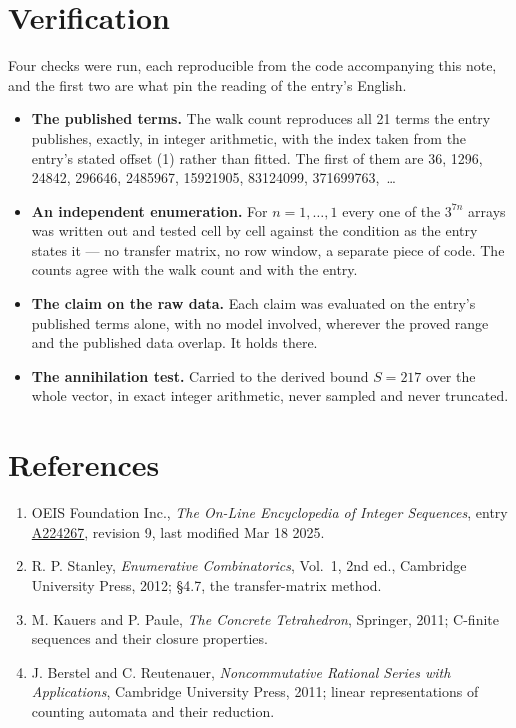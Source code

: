 \documentclass[11pt]{article}
\theoremstyle{definition}
\begin{document}
\section{Verification}

Four checks were run, each reproducible from the code accompanying this note, and the first two are what pin the reading of the entry's English.

\begin{itemize}

\item {\bfseries The published terms.} The walk count reproduces all 21 terms the entry publishes, exactly, in integer arithmetic, with the index taken from the entry's stated offset (1) rather than fitted. The first of them are 36, 1296, 24842, 296646, 2485967, 15921905, 83124099, 371699763,~\dots

\item {\bfseries An independent enumeration.} For $n = 1,\dots,1$ every one of the $3^{7n}$ arrays was written out and tested cell by cell against the condition as the entry states it --- no transfer matrix, no row window, a separate piece of code. The counts agree with the walk count and with the entry.

\item {\bfseries The claim on the raw data.} Each claim was evaluated on the entry's published terms alone, with no model involved, wherever the proved range and the published data overlap. It holds there.

\item {\bfseries The annihilation test.} Carried to the derived bound $S = 217$ over the whole vector, in exact integer arithmetic, never sampled and never truncated.

\end{itemize}

\section{References}

\begin{enumerate}

\item OEIS Foundation Inc., \emph{The On-Line Encyclopedia of Integer Sequences}, entry \href{https://oeis.org/A224267}{A224267}, revision 9, last modified Mar 18 2025.

\item R. P. Stanley, \emph{Enumerative Combinatorics}, Vol.~1, 2nd ed., Cambridge University Press, 2012; \S4.7, the transfer-matrix method.

\item M. Kauers and P. Paule, \emph{The Concrete Tetrahedron}, Springer, 2011; C-finite sequences and their closure properties.

\item J. Berstel and C. Reutenauer, \emph{Noncommutative Rational Series with Applications}, Cambridge University Press, 2011; linear representations of counting automata and their reduction.

\end{enumerate}
\end{document}
